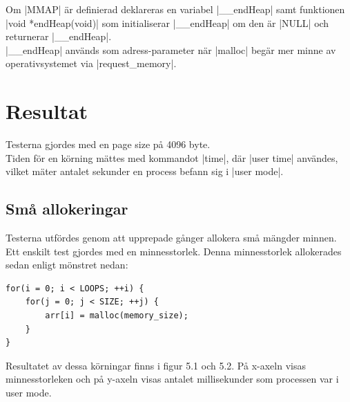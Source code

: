 \documentclass[paper=a4, fontsize=11pt]{scrartcl} %
\numberwithin{equation}{section} %
\numberwithin{figure}{section} %
\numberwithin{table}{section} %
\begin{document}
%
%
Om |MMAP| är definierad deklareras en variabel |__endHeap| samt funktionen 
|void *endHeap(void)| som initialiserar |__endHeap| om den är |NULL| och returnerar |__endHeap|.\\

|__endHeap| används som adress-parameter när |malloc| begär mer minne av operativsystemet via |request_memory|.




\section{Resultat}

Testerna gjordes med en page size på 4096 byte.\\
Tiden för en körning mättes med kommandot |time|, där |user time| användes, vilket mäter antalet sekunder en process
befann sig i |user mode|.

\subsection{Små allokeringar}

Testerna utfördes genom att upprepade gånger allokera små mängder minnen.
Ett enskilt test gjordes med en minnesstorlek. Denna minnesstorlek allokerades sedan enligt mönstret nedan:

\begin{verbatim}
for(i = 0; i < LOOPS; ++i) {
    for(j = 0; j < SIZE; ++j) {
        arr[i] = malloc(memory_size);
    }
}
\end{verbatim}

Resultatet av dessa körningar finns i figur 5.1 och 5.2. På x-axeln visas minnesstorleken och på y-axeln visas antalet millisekunder som processen var i user mode.
\end{document}
